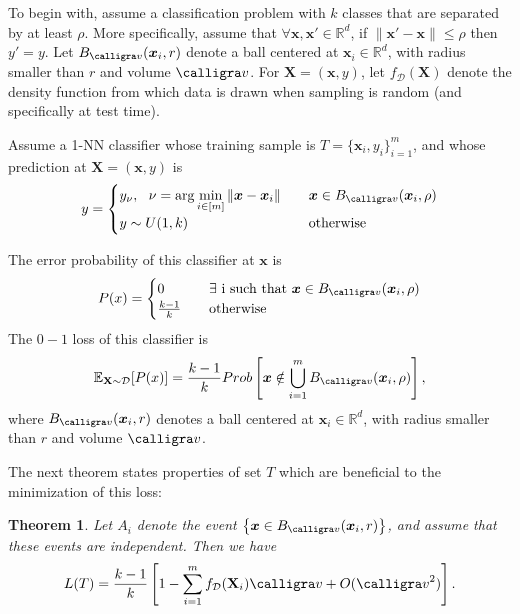 \documentclass{article}
\newcommand{\E}{\mathbb{E}}
\newcommand{\R}{\mathbb{R}}
\newcommand{\bx}{\bm{x}}
\newcommand{\bX}{{\mathbf X}}
\newcommand{\Dd}{\mathcal{D}}
\newtheorem{theorem}{Theorem}
\begin{document}
To begin with, assume a classification problem with $k$ classes that are separated by at least $\rho$. More specifically, assume that $\forall \bx,\bx'\in\mathbb{R}^{d}$, if $\|\bx'-\bx\|\leq\rho$ then  $y'=y$. Let $B_{\calligra v}(\bx_i,r)$ denote a ball centered at $\bx_i\in\R^d$, with radius smaller than $r$ and volume ${\calligra v}$. For $\bX=(\bx,y)$, let $f_\Dd(\bX)$ denote the density function from which data is drawn when sampling is random (and specifically at test time).

Assume a 1-NN classifier whose training sample is $T=\{\bx_i,y_i\}_{i=1}^m$, and whose prediction at $\bX=(\bx,y)$ is 
\begin{equation*}
y=\begin{cases}
y_\nu,~~ \nu=\mathrm{arg}\min\limits_{i\in [m]}\|\bx-\bx_i\| & \quad   \bx\in B_{\calligra v}(\bx_i,\rho) \\
y\sim U(1,k) & \quad\mathrm{otherwise}\\
\end{cases}
\end{equation*}

The error probability of this classifier at $\bx$ is
\begin{equation*}
P(x)=\begin{cases}
0 & \quad \exists \mathrm{~i~such~that~} \bx\in B_{\calligra v}(\bx_i,\rho)\\
\frac{k-1}{k} & \quad\mathrm{otherwise}
\end{cases}
\end{equation*}
The $0-1$ loss of this classifier is
\begin{equation}
\label{eq:union}
\E_{\bX\sim\Dd}[P(x)]=\frac{k-1}{k} Prob\left [\bx\notin \bigcup_{i=1}^{m} B_{\calligra v}(\bx_i,\rho) \right ],
\end{equation}
where $B_{\calligra v}(\bx_i,r)$ denotes a ball centered at $\bx_i\in\R^d$, with radius smaller than $r$ and volume ${\calligra v}$. 

The next theorem states properties of set $T$ which are beneficial to the minimization of this loss:

\begin{theorem}
\label{thm:expected_error_1nn}
Let $A_i$ denote the event $\left \{\bx\in B_{\calligra v}(\bx_i,r)\right \}$, and assume that these events are independent. Then we have
\begin{equation*}
L(T) = \frac{k-1}{k} \left [1- \sum_{i=1}^m  f_\Dd(\bX_i){\calligra v} + O({\calligra v}^2)\right ].
\end{equation*}
\end{theorem}
\end{document}
